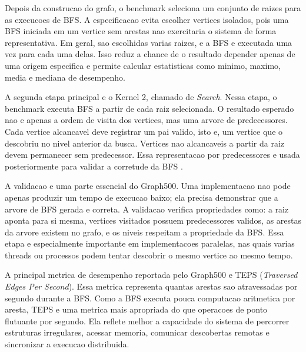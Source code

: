 Depois da construcao do grafo, o benchmark seleciona um conjunto de raizes para
as execucoes de BFS. A especificacao evita escolher vertices isolados, pois uma
BFS iniciada em um vertice sem arestas nao exercitaria o sistema de forma
representativa. Em geral, sao escolhidas varias raizes, e a BFS e executada uma
vez para cada uma delas. Isso reduz a chance de o resultado depender apenas de
uma origem especifica e permite calcular estatisticas como minimo, maximo, media
e mediana de desempenho.

A segunda etapa principal e o Kernel 2, chamado de \textit{Search}. Nessa etapa,
o benchmark executa BFS a partir de cada raiz selecionada. O resultado esperado
nao e apenas a ordem de visita dos vertices, mas uma arvore de predecessores.
Cada vertice alcancavel deve registrar um pai valido, isto e, um vertice que o
descobriu no nivel anterior da busca. Vertices nao alcancaveis a partir da raiz
devem permanecer sem predecessor. Essa representacao por predecessores e usada
posteriormente para validar a corretude da BFS \cite{graph500spec}.

A validacao e uma parte essencial do Graph500. Uma implementacao nao pode apenas
produzir um tempo de execucao baixo; ela precisa demonstrar que a arvore de BFS
gerada e correta. A validacao verifica propriedades como: a raiz aponta para si
mesma, vertices visitados possuem predecessores validos, as arestas da arvore
existem no grafo, e os niveis respeitam a propriedade da BFS. Essa etapa e
especialmente importante em implementacoes paralelas, nas quais varias threads
ou processos podem tentar descobrir o mesmo vertice ao mesmo tempo.

A principal metrica de desempenho reportada pelo Graph500 e TEPS
(\textit{Traversed Edges Per Second}). Essa metrica representa quantas arestas
sao atravessadas por segundo durante a BFS. Como a BFS executa pouca computacao
aritmetica por aresta, TEPS e uma metrica mais apropriada do que operacoes de
ponto flutuante por segundo. Ela reflete melhor a capacidade do sistema de
percorrer estruturas irregulares, acessar memoria, comunicar descobertas remotas
e sincronizar a execucao distribuida.
